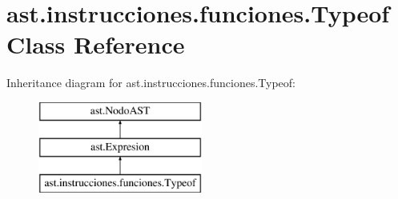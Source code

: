 \hypertarget{classast_1_1instrucciones_1_1funciones_1_1_typeof}{}\section{ast.\+instrucciones.\+funciones.\+Typeof Class Reference}
\label{classast_1_1instrucciones_1_1funciones_1_1_typeof}
Inheritance diagram for ast.\+instrucciones.\+funciones.\+Typeof\+:\begin{figure}[H]
\begin{center}
\leavevmode
\includegraphics[height=3.000000cm]{classast_1_1instrucciones_1_1funciones_1_1_typeof}
\end{center}
\end{figure}
